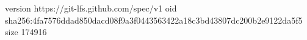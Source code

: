 version https://git-lfs.github.com/spec/v1
oid sha256:4fa7576ddad850dacd08f9a3f0443563422a18c3bd43807dc200b2e9122da5f5
size 174916
